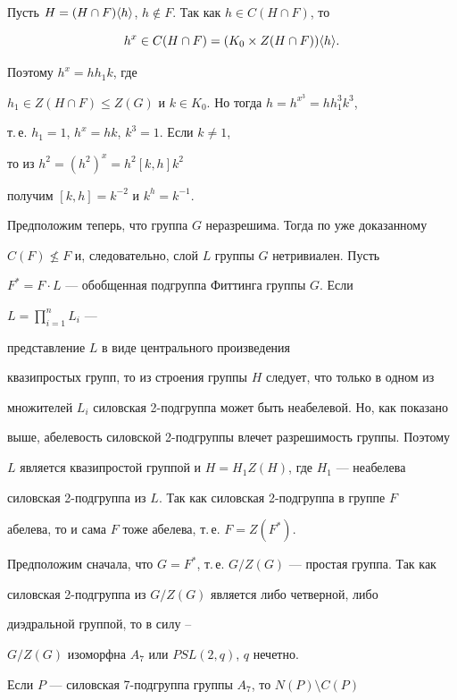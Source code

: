 \begin{pf}
Пусть $H=(H\cap F)\langle h\rangle$, $h\notin F$. Так как $h\in C(H\cap F)$, то


$$


h^x\in C(H\cap F)=(K_0\times Z(H\cap F))\ls h\ps.


$$


Поэтому $h^x=hh_1k$, где


$h_1\in Z(H\cap F)\le Z(G)$ и $k\in K_0$. Но тогда $h=h^{x^3}=hh_1^3k^3$,


т.\,е. $h_1=1$, $h^x=hk$, $k^3=1$. Если $k\ne 1$,


то из $h^2=(h^2)^x=h^2[k,h]k^2$


получим $[k,h]=k^{-2}$ и $k^h=k^{-1}$.





Предположим теперь, что группа $G$ неразрешима. Тогда по уже доказанному


$C(F)\not\le F$ и, следовательно, слой $L$ группы $G$ нетривиален. Пусть


$F^*=F\cdot L$ --- обобщенная подгруппа Фиттинга группы $G$. Если


$L=\prod\limits_{i=1}^{n}L_i$ ---


представление $L$ в виде центрального произведения


квазипростых групп, то из строения группы $H$ следует, что только в одном из


множителей $L_i$ силовская 2-подгруппа может быть неабелевой. Но, как показано


выше, абелевость силовской 2-подгруппы влечет разрешимость группы. Поэтому


$L$ является квазипростой группой и $H=H_1Z(H)$, где $H_1$ --- неабелева


силовская 2-подгруппа из $L$. Так как силовская 2-подгруппа в группе $F$


абелева, то и сама $F$ тоже абелева, т.\,е. $F=Z(F^*)$.





Предположим сначала, что $G=F^*$, т.\,е. $G/Z(G)$ --- простая группа. Так как


силовская 2-подгруппа из $G/Z(G)$ является либо четверной, либо


диэдральной группой, то в силу \cite{gorwol}--\cite{gorwol2}


$G/Z(G)$ изоморфна $A_7$ или $PSL(2,q)$, $q$ нечетно.





Если $P$ --- силовская 7-подгруппа группы $A_7$, то $N(P)\setminus C(P)$



\end{pf}
